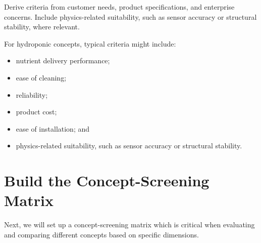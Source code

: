 \begin{tcolorbox}[title=Hint]
Derive criteria from customer needs, product specifications, and enterprise concerns. Include physics-related suitability, such as sensor accuracy or structural stability, where relevant.
\end{tcolorbox}

For hydroponic concepts, typical criteria might include:
\begin{itemize}
    \item nutrient delivery performance;
    \item ease of cleaning;
    \item reliability;
    \item product cost;
    \item ease of installation; and
    \item physics-related suitability, such as sensor accuracy or structural stability.
\end{itemize}

\section{Build the Concept-Screening Matrix}

Next, we will set up a concept-screening matrix which is critical when evaluating and comparing different concepts based on specific dimensions.


